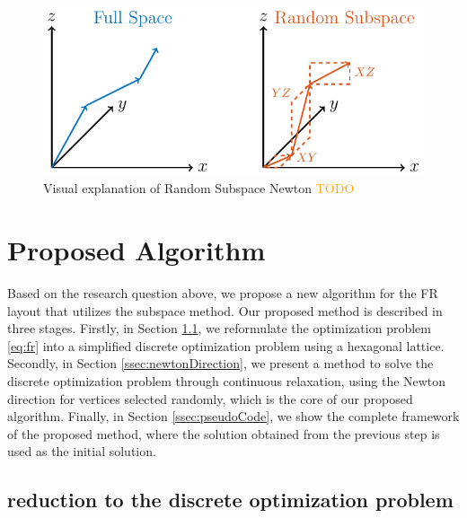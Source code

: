 \documentclass[dvipdfmx,lettersize,journal]{IEEEtran}
\newcommand{\orange}[1]{\textcolor{orange}{#1}}
\begin{document}
\begin{figure}[t]
  \centering
  \includegraphics[width=\columnwidth]{randomSubspace.pdf}
  \caption{
    Visual explanation of Random Subspace Newton
    \orange{TODO}
  }
  \label{fig:randomSubspace}
\end{figure}

\section{Proposed Algorithm}\label{sec:algorithm}

Based on the research question above, we propose a new algorithm for the FR layout that utilizes the subspace method.
Our proposed method is described in three stages.
Firstly, in Section \ref{ssec:reduction}, we reformulate the optimization problem \eqref{eq:fr} into a simplified discrete optimization problem using a hexagonal lattice.
Secondly, in Section \ref{ssec:newtonDirection}, we present a method to solve the discrete optimization problem through continuous relaxation, using the Newton direction for vertices selected randomly, which is the core of our proposed algorithm.
Finally, in Section \ref{ssec:pseudoCode}, we show the complete framework of the proposed method, where the solution obtained from the previous step is used as the initial solution.

\subsection{reduction to the discrete optimization problem}\label{ssec:reduction}
\end{document}
